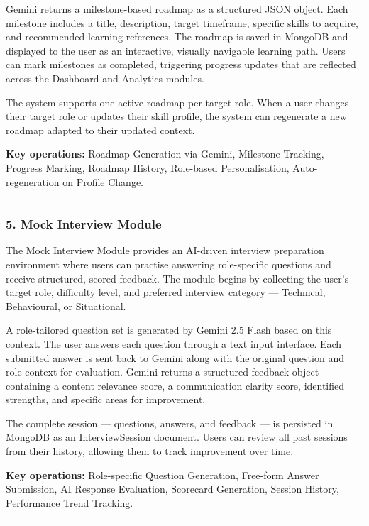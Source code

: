 \documentclass[12pt]{article}
\begin{document}
Gemini returns a milestone-based roadmap as a structured JSON object. Each milestone includes a title, description, target timeframe, specific skills to acquire, and recommended learning references. The roadmap is saved in MongoDB and displayed to the user as an interactive, visually navigable learning path. Users can mark milestones as completed, triggering progress updates that are reflected across the Dashboard and Analytics modules.

The system supports one active roadmap per target role. When a user changes their target role or updates their skill profile, the system can regenerate a new roadmap adapted to their updated context.

\textbf{Key operations:} Roadmap Generation via Gemini, Milestone Tracking, Progress Marking, Roadmap History, Role-based Personalisation, Auto-regeneration on Profile Change.

\noindent\rule{\textwidth}{0.4pt}

\subsubsection{5. Mock Interview Module}

The Mock Interview Module provides an AI-driven interview preparation environment where users can practise answering role-specific questions and receive structured, scored feedback. The module begins by collecting the user's target role, difficulty level, and preferred interview category — Technical, Behavioural, or Situational.

A role-tailored question set is generated by Gemini 2.5 Flash based on this context. The user answers each question through a text input interface. Each submitted answer is sent back to Gemini along with the original question and role context for evaluation. Gemini returns a structured feedback object containing a content relevance score, a communication clarity score, identified strengths, and specific areas for improvement.

The complete session — questions, answers, and feedback — is persisted in MongoDB as an InterviewSession document. Users can review all past sessions from their history, allowing them to track improvement over time.

\textbf{Key operations:} Role-specific Question Generation, Free-form Answer Submission, AI Response Evaluation, Scorecard Generation, Session History, Performance Trend Tracking.

\noindent\rule{\textwidth}{0.4pt}
\end{document}
